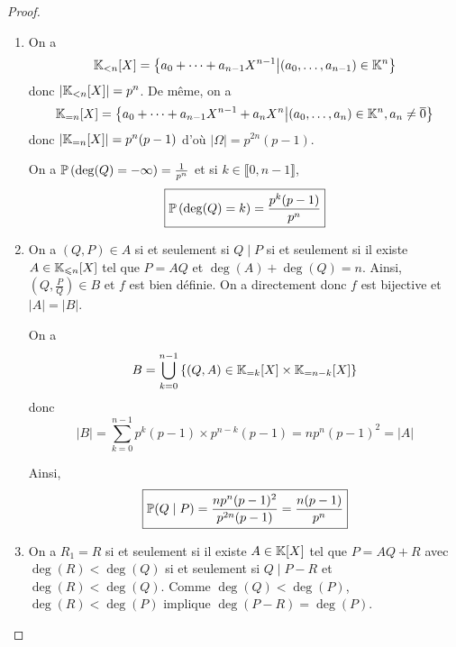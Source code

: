 \begin{proof}
    \phantom{}
    \begin{enumerate}
        \item On a 
        \begin{equation}
            \K_{<n}[X]=\left\lbrace a_{0}+\dots+a_{n-1}X^{n-1}\middle|(a_{0},\dots,a_{n-1})\in\K^{n}\right\rbrace    
        \end{equation}
        donc $\left\lvert\K_{<n}[X]\right\rvert=p^{n}$. De même, on a 
        \begin{equation}
            \K_{=n}[X]=\left\lbrace a_{0}+\dots+a_{n-1}X^{n-1}+a_{n}X^{n}\middle|(a_{0},\dots,a_{n})\in\K^{n},a_{n}\neq\overline{0}\right\rbrace
        \end{equation}
        donc $\left\lvert\K_{=n}[X]\right\rvert=p^{n}(p-1)$ d'où $\left\lvert\Omega\right\rvert=p^{2n}(p-1)$.

        On a $\P\left(\deg(Q)=-\infty\right)=\frac{1}{p^{n}}$ et si $k\in\llbracket0,n-1\rrbracket$,
        \begin{equation}
            \boxed{\P\left(\deg(Q)=k\right)=\frac{p^{k}(p-1)}{p^{n}}}
        \end{equation}

        \item On a $(Q,P)\in A$ si et seulement si $Q\mid P$ si et seulement si il existe $A\in\K_{\leqslant n}[X]$ tel que $P=AQ$ et $\deg(A)+\deg(Q)=n$. Ainsi, $\left(Q,\frac{P}{Q}\right)\in B$ et $f$ est bien définie. On a directement
        donc $f$ est bijective et $\left\lvert A\right\rvert =\left\lvert B\right\rvert$.

        On a 
        \begin{equation}
            B=\bigcup_{k=0}^{n-1}\left\lbrace(Q,A)\in\K_{=k}[X]\times\K_{=n-k}[X]\right\rbrace
        \end{equation}
        donc 
        \begin{equation}
            \left\lvert B\right\rvert=\sum_{k=0}^{n-1}p^{k}(p-1)\times p^{n-k}(p-1)=np^{n}(p-1)^{2}=\left\lvert A\right\rvert
        \end{equation}

        Ainsi, 
        \begin{equation}
            \boxed{\P(Q\mid P)=\frac{np^{n}(p-1)^{2}}{p^{2n}(p-1)}=\frac{n(p-1)}{p^{n}}}
        \end{equation}

        \item On a $R_{1}=R$ si et seulement si il existe $A\in\K[X]$ tel que $P=AQ+R$ avec $\deg(R)<\deg(Q)$ si et seulement si $Q\mid P-R$ et $\deg(R)<\deg(Q)$. Comme $\deg(Q)<\deg(P)$, $\deg(R)<\deg(P)$ implique $\deg(P-R)=\deg(P)$.
        

\end{enumerate}
\end{proof}
